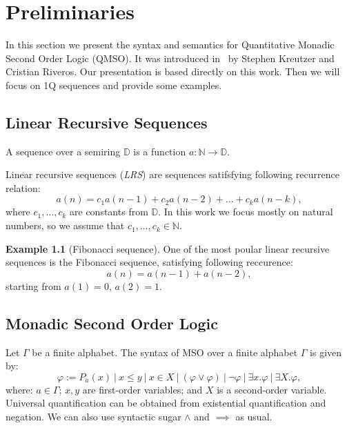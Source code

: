 \documentclass[en]{pracamgr}
\theoremstyle{definition}
\newtheorem{example}{Example}[section]
\begin{document}
\chapter{Preliminaries}
In this section we present the syntax and semantics for Quantitative Monadic Second Order Logic (QMSO). It was introduced in~\cite{KreutzerR13} by Stephen Kreutzer and Cristian Riveros. Our presentation is based directly on this work. Then we will focus on 1Q sequences and provide some examples.

\section{Linear Recursive Sequences}
A sequence over a semiring $\mathbb{D}$ is a function $a : \mathbb{N} \rightarrow \mathbb{D}$.

Linear recursive sequences (\emph{LRS}) are sequences satifsfying following recurrence relation:
$$a(n) = c_1 a(n-1) + c_2 a(n-2) + \ldots + c_k a(n-k),$$
where $c_1,\ldots,c_k$ are constants from $\mathbb{D}$. In this work we focus mostly on natural numbers, so we assume that $c_1,\ldots ,c_k \in \mathbb{N}$.

\begin{example}[Fibonacci sequence]
    One of the most poular linear recursive sequences is the Fibonacci sequence, satisfying following reccurence:
    $$a(n) = a(n-1) + a(n-2),$$
    starting from $a(1) = 0$, $a(2) = 1$.
\end{example}

\section{Monadic Second Order Logic}

Let $\Gamma$ be a finite alphabet. The syntax of MSO over a finite alphabet $\Gamma$ is given by:
$$ \varphi := P_a(x) \ | \ x \leq y \ | \ x \in X \ | \ (\varphi \lor \varphi) \ | \ \neg \varphi \ | \ \exists x. \varphi \ | \ \exists X . \varphi, $$
where: $a \in \Gamma$; $x, y$ are first-order variables; and $X$ is a second-order variable. Universal quantification can be obtained from existential quantification and negation. We can also use syntactic sugar $\land$ and $\implies$ as usual.
\end{document}
